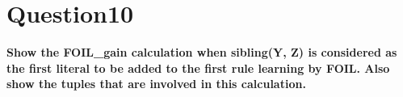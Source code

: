 \documentclass[paper=a4, fontsize=11pt]{scrartcl} %
\numberwithin{equation}{section} %
\numberwithin{figure}{section} %
\numberwithin{table}{section} %
\begin{document}
\newpage
\section*{Question10}
\textbf{Show the FOIL\_gain calculation when sibling(Y, Z) is considered as the first literal to be added to the first rule learning by FOIL. Also show the tuples that are involved in this calculation.}
\end{document}
